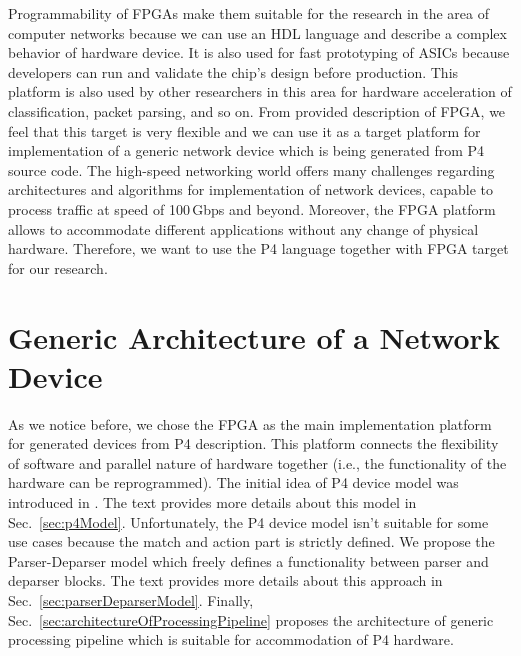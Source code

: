 Programmability of FPGAs make them suitable for the research in the area of computer networks because we can use an HDL language and describe
a complex behavior of hardware device. It is also used for fast prototyping of ASICs because developers can run and validate the chip's design
before production. This platform is also used by other researchers in this area for hardware acceleration of classification, packet parsing, and 
so on.
From provided description of FPGA, we feel that this target is very flexible and we can use it as a target platform
for implementation of a generic network device which is being generated from P4 source code.
The high-speed networking world offers many challenges regarding architectures and algorithms for implementation of network devices, 
capable to process traffic at speed of 100\,Gbps and beyond.
Moreover, the FPGA platform allows to accommodate different applications without any change of physical hardware. 
Therefore, we want to use the P4 language together with FPGA target for our research.

\section{Generic Architecture of a Network Device}

As we notice before, we chose the FPGA as the main implementation platform for generated devices from P4 description. 
This platform connects the flexibility of software and parallel nature of hardware together 
(i.e., the functionality of the hardware can be reprogrammed).
The initial idea of P4 device model was introduced in \cite{p4,p4languagespec,GibbPhd}. 
The text provides more details about this model in Sec.~\ref{sec:p4Model}.
Unfortunately, the P4 device model isn't suitable for some use cases because the match and action part is strictly defined. 
We propose the Parser-Deparser model which freely defines a functionality between parser and deparser blocks.
The text provides more details about this approach in Sec.~\ref{sec:parserDeparserModel}.
Finally, Sec.~\ref{sec:architectureOfProcessingPipeline} proposes the architecture of generic processing pipeline
which is suitable for accommodation of P4 hardware.  

